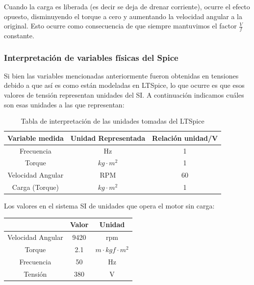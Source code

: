 \documentclass[e4_tp3_main.tex]{subfiles}
\begin{document}

Cuando la carga es liberada (es decir se deja de drenar corriente), ocurre el efecto opuesto, disminuyendo el torque a cero y aumentando la velocidad angular a la original. Esto ocurre como consecuencia de que siempre mantuvimos el factor $\frac{V}{f}$ constante.

\subsubsection{Interpretación de variables físicas del Spice}
Si bien las variables mencionadas anteriormente fueron obtenidas en tensiones debido a que así es como están modeladas en LTSpice, lo que ocurre es que esos valores de tensión representan unidades del SI. A continuación indicamos cuáles son esas unidades a las que representan:

\begin{table}[H]
\centering
\begin{tabular}{@{}ccc@{}}

Variable medida   & Unidad Representada     & Relación unidad/V \\ \midrule
Frecuencia        & Hz                      & 1                 \\
Torque            & $kg \cdot m^2$ & 1                 \\
Velocidad Angular & RPM                     & 60                \\
Carga (Torque)    & $kg \cdot m^2$ & 1                 \\ \bottomrule
\end{tabular}
\caption{Tabla de interpretación de las unidades tomadas del LTSpice}
\end{table}

Los valores en el sistema SI de unidades que opera el motor sin carga:

\begin{table}[h]
\centering
\begin{tabular}{clll|c|c|}
\cline{5-6}
\multicolumn{4}{c|}{}                    & Valor & Unidad \\ \hline
\multicolumn{4}{|c|}{Velocidad Angular} & 9420  & rpm    \\ \hline
\multicolumn{4}{|c|}{Torque}            & 2.1   & $m \cdot kgf \cdot m^2$    \\ \hline
\multicolumn{4}{|c|}{Frecuencia}        & 50    & Hz     \\ \hline
\multicolumn{4}{|c|}{Tensi\'on}           & 380   & V      \\ \hline
\end{tabular}
\end{table}
\end{document}

